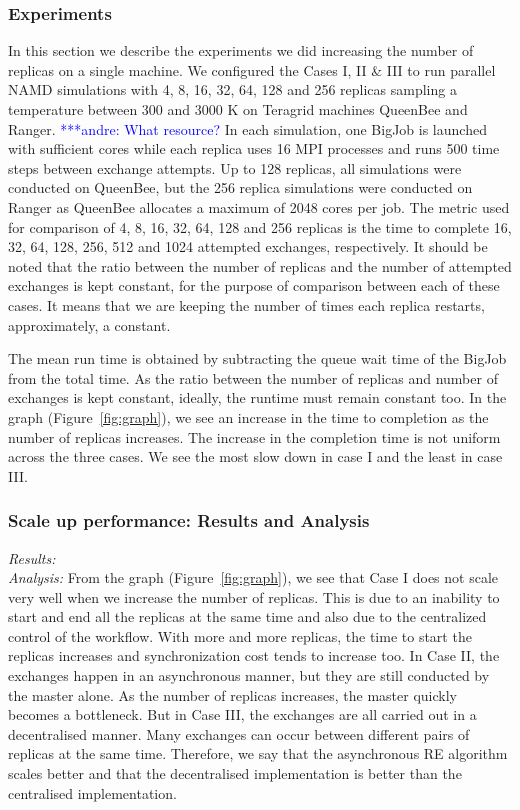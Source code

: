 \documentclass{rspublic}
\newcommand{\alnote}[1]{ {\textcolor{blue} { ***andre: #1 }}}
\newcommand{\alnote}[1]{}
\begin{document}
\subsubsection{Experiments}
In this section we describe the experiments we did increasing the number of replicas on a single machine. We configured the Cases I, II \& III to run parallel NAMD simulations with 4, 8, 16, 32, 64, 128 and 256 replicas sampling a temperature between 300 and 3000 K on Teragrid machines QueenBee and Ranger. \alnote{What resource?} In each simulation, one BigJob is launched with sufficient cores while each replica uses 16 MPI processes and runs 500 time steps between exchange attempts. Up to 128 replicas, all simulations were conducted on QueenBee, but the 256 replica simulations were conducted on Ranger as QueenBee allocates a maximum of 2048 cores per job. The metric used for comparison of 4, 8, 16, 32, 64, 128 and 256 replicas is the time to complete 16, 32, 64, 128, 256, 512 and 1024 attempted exchanges, respectively. It should be noted that the ratio between the number of replicas and the number of attempted exchanges is kept constant, for the purpose of comparison between each of these cases. It means that we are keeping the number of times each replica restarts, approximately, a constant. 

The mean run time is obtained by subtracting the queue wait time of the BigJob from the total time. As the ratio between the number of replicas and number of exchanges is kept constant, ideally, the runtime must remain constant too. In the graph (Figure~\ref{fig:graph}), we see an increase in the time to completion as the number of replicas increases. The increase in the completion time is not uniform across the three cases. We see the most slow down in case I and the least in case III.

\subsubsection{Scale up performance: Results and Analysis}

{\it Results:}\\

{\it Analysis: } From the graph (Figure~\ref{fig:graph}), we see that
Case I does not scale very well when we increase the number of
replicas. This is due to an inability to start and end all the
replicas at the same time and also due to the centralized control of the workflow. With more and more replicas, the time to start the replicas increases  and 
synchronization cost tends to increase too.  In Case II, the exchanges happen in
an asynchronous manner, but they are still conducted by the master
alone. As the number of replicas increases, the master quickly becomes
a bottleneck. But in Case III, the exchanges are all carried out in a
decentralised manner. Many exchanges can occur between different pairs
of replicas at the same time. Therefore, we say that the asynchronous
RE algorithm scales better and that the decentralised implementation
is better than the centralised implementation.
\end{document}
